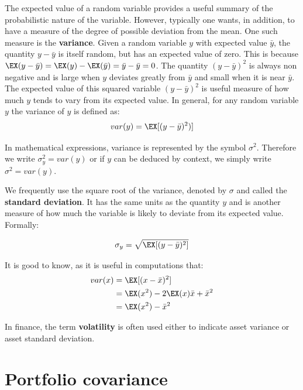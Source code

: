 \hfill \break

The expected value of a random variable provides a useful summary of the probabilistic nature of the variable. However, typically one wants, in addition, to have a measure of the degree of possible deviation from the mean. One such measure is the \textbf{variance}.
Given a random variable $y$ with expected value $\bar{y}$, the quantity $y-\bar{y}$ is itself random, but has an expected value of zero. This is because $\EX(y-\bar{y})=\EX(y)-\EX(\bar{y})=\bar{y}-\bar{y}=0$. The quantity $(y-\bar{y})^2$ is always non negative and is large when $y$ deviates greatly from $\bar{y}$ and small when it is near $\bar{y}$. The expected value of this squared variable $(y-\bar{y})^2$ is useful measure of how much $y$ tends to vary from its expected value.
In general, for any random variable $y$ the variance of $y$ is defined as:
$$ var(y) = \EX[(y-\bar{y})^2)]$$

In mathematical expressions, variance is represented by the symbol $\sigma^2$. Therefore we write $\sigma^2_y = var(y)$ or if $y$ can be deduced by context, we simply write $\sigma^2=var(y)$.

\hfill \break

We frequently use the square root of the variance, denoted by $\sigma$ and called the \textbf{standard deviation}. It has the same units as the quantity $y$ and is another measure of how much the variable is likely to deviate from its expected value. Formally:

$$ \sigma_y = \sqrt{\EX[(y-\bar{y})^2]}$$

It is good to know, as it is useful in computations that:
\begin{equation}
    \label{eq:variance_conventient}
    \begin{split}
        var(x) & = \EX[(x-\bar{x})^2] \\
        & = \EX(x^2) - 2\EX(x)\bar{x} + \bar{x}^2 \\
        & = \EX(x^2) - \bar{x}^2
    \end{split}
\end{equation}

In finance, the term \textbf{volatility} is often used either to indicate asset variance or asset standard deviation.

\section{Portfolio covariance}
\label{s:portfolio_covariance}

